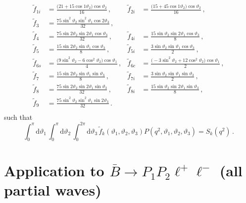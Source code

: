 \documentclass[aps,prd,reprint,nofootinbib,preprintnumbers]{revtex4}
\newcommand{\dual}[1]{\tilde{#1}}
\newcommand{\rmdx}[1]{\mbox{d} #1 \,} %
\renewcommand{\theta}{\vartheta}
\begin{document}
\begin{equation}
\begin{aligned}
    \dual{f}_{1i} & = \frac{\big(21 + 15 \cos1\theta_2\big)\cos\theta_2}{16}               \,,&
    \dual{f}_{2i} & = \frac{\big(15 + 45 \cos1\theta_2\big)\cos\theta_2}{16}               \,,\\
    \dual{f}_{3}  & = \frac{75 \sin^2\theta_2 \sin^2\theta_1 \cos2\theta_3}{32}                \,,& &\\
    \dual{f}_{4}  & = \frac{75 \sin 2\theta_2 \sin 2\theta_1 \cos \theta_3}{32}                \,,&
    \dual{f}_{4i} & = \frac{15 \sin  \theta_2 \sin 2\theta_1 \cos \theta_3}{8}                 \,,\\
    \dual{f}_{5}  & = \frac{15 \sin 2\theta_2 \sin  \theta_1 \cos \theta_3}{8}                 \,,&
    \dual{f}_{5i} & = \frac{3  \sin  \theta_2 \sin  \theta_1 \cos \theta_3}{2}                 \,,\\
    \dual{f}_{6s} & = \frac{\big( 9\sin^2\theta_2 -  6 \cos^2\theta_2\big)\cos\theta_1}{4} \,,&
    \dual{f}_{6c} & = \frac{\big(-3\sin^2\theta_2 + 12 \cos^2\theta_2\big)\cos\theta_1}{2} \,,\\
    \dual{f}_{7}  & = \frac{15 \sin 2\theta_2 \sin  \theta_1 \sin \theta_3}{8}                 \,,&
    \dual{f}_{7i} & = \frac{3  \sin  \theta_2 \sin  \theta_1 \sin \theta_3}{2}                 \,,\\
    \dual{f}_{8}  & = \frac{75 \sin 2\theta_2 \sin 2\theta_1 \sin \theta_3}{32}                \,,&
    \dual{f}_{8i} & = \frac{15 \sin  \theta_2 \sin 2\theta_1 \sin \theta_3}{8}                 \,,\\
    \dual{f}_{9}  & = \frac{75 \sin^2\theta_2 \sin^2\theta_1 \sin2\theta_3}{32}                \,.\\
\end{aligned}
\end{equation}
such that
\begin{equation}
    \int_0^\pi \rmdx{\theta_1} \int_0^\pi \rmdx{\theta_2} \int_0^{2\pi} \rmdx{\theta_3} \dual{f}_k(\theta_1,\theta_2,\theta_3) P(q^2, \theta_1,\theta_2,\theta_3) = S_k(q^2)\,.
\end{equation}

\section{Application to $\bar{B}\to P_1 P_2\ell^+\ell^-$ (all partial waves)}
\label{app:btokpill}
\end{document}
